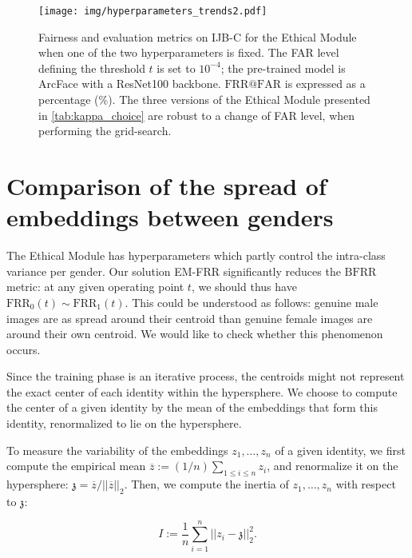 \documentclass[nohyperref]{article}
\theoremstyle{plain}
\theoremstyle{definition}
\theoremstyle{remark}
\begin{document}
\begin{figure*}[ht]
\vspace{-0.2cm}
\hspace{-1cm}
    \texttt{[image: img/hyperparameters\_trends2.pdf]}
    \vspace{-0.9cm}
    \caption{Fairness and evaluation metrics on IJB-C for the Ethical Module when one of the two hyperparameters is fixed. The FAR level defining the threshold $t$ is set to $10^{-4}$; the pre-trained model is ArcFace with a ResNet100 backbone. $\mathrm{FRR}@\mathrm{FAR}$ is expressed as a percentage (\%). The three versions of the Ethical Module presented in \autoref{tab:kappa_choice} are robust to a change of FAR level, when performing the grid-search.}
    \label{fig:hyperparam_trends2}
    \vspace{-0.1in}
\end{figure*}





\section{Comparison of the spread of embeddings between genders}

The Ethical Module has hyperparameters which partly control the intra-class variance per gender. Our solution EM-FRR significantly reduces the $\mathrm{BFRR}$ metric: at any given operating point $t$, we should thus have $\mathrm{FRR}_0(t) \sim \mathrm{FRR}_1(t)$. This could be understood as follows: genuine male images are as spread around their centroid than genuine female images are around their own centroid. We would like to check whether this phenomenon occurs.

Since the training phase is an iterative process, the centroids might not represent the exact center of each identity within the hypersphere. We choose to compute the center of a given identity by the mean of the embeddings that form this identity, renormalized to lie on the hypersphere.

To measure the variability of the embeddings $z_1, \ldots, z_n$ of a given identity, we first compute the empirical mean $\overline{z} := (1/n) \sum_{1 \leq i \leq n} z_i$, and renormalize it on the hypersphere: $\mathfrak{z} = \overline{z} / || \overline{z} ||_2$. Then, we compute the inertia of $z_1, \ldots, z_n$ with respect to $\mathfrak{z}$:

\[ I := \frac{1}{n} \sum\limits_{i=1}^n || z_i - \mathfrak{z} ||_2^2. \]
\end{document}
